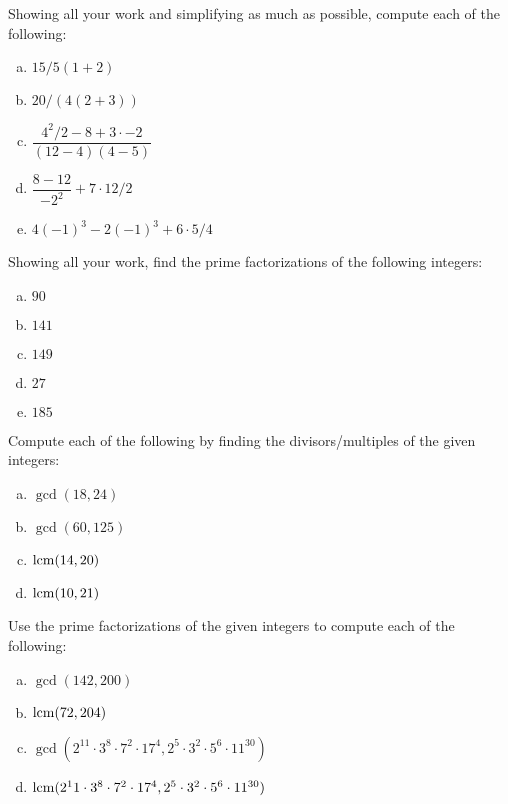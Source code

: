 \documentclass[11pt,letterpaper]{article}
\begin{document}

 Showing all your work and simplifying as much as possible, compute each of the following:
        \begin{enumerate}[(a)]
        \item $15/5(1 + 2)$
        \item $20/(4(2 + 3))$
        \item $\dfrac{4^2/2 - 8 + 3 \cdot -2}{(12 - 4)(4 - 5)}$
        \item $\dfrac{8 - 12}{-2^2} + 7 \cdot 12/2$
        \item $4(-1)^3 - 2(-1)^3 + 6 \cdot 5/4$
        \end{enumerate}



\newpage



 Showing all your work, find the prime factorizations of the following integers:
        \begin{enumerate}[(a)]
        \item $90$
        \item $141$
        \item $149$
        \item $27$
        \item $185$
        \end{enumerate}



\newpage



 Compute each of the following by finding the divisors/multiples of the given integers:
        \begin{enumerate}[(a)]
        \item $\gcd(18, 24)$
        \item $\gcd(60, 125)$
        \item $\operatorname{lcm}(14, 20)$
        \item $\operatorname{lcm}(10, 21)$
        \end{enumerate}



\newpage



 Use the prime factorizations of the given integers to compute each of the following:
        \begin{enumerate}[(a)]
        \item $\gcd(142, 200)$
        \item $\operatorname{lcm}(72, 204)$
        \item $\gcd(2^11 \cdot 3^8 \cdot 7^2 \cdot 17^4, 2^5 \cdot 3^2 \cdot 5^6 \cdot 11^{30})$
        \item $\operatorname{lcm}(2^11 \cdot 3^8 \cdot 7^2 \cdot 17^4, 2^5 \cdot 3^2 \cdot 5^6 \cdot 11^{30})$
        \end{enumerate}
\end{document}
